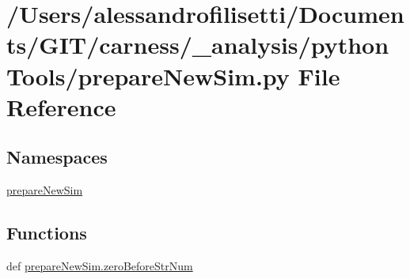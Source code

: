 \hypertarget{a00099}{\section{/\-Users/alessandrofilisetti/\-Documents/\-G\-I\-T/carness/\-\_\-analysis/python\-Tools/prepare\-New\-Sim.py File Reference}
\label{a00099}
}
\subsection*{Namespaces}
\begin{DoxyCompactItemize}
\item 
\hyperlink{a00153}{prepare\-New\-Sim}
\end{DoxyCompactItemize}
\subsection*{Functions}
\begin{DoxyCompactItemize}
\item 
def \hyperlink{a00153_a6b14bf9916da5f148ec52646dd61250d}{prepare\-New\-Sim.\-zero\-Before\-Str\-Num}
\end{DoxyCompactItemize}

